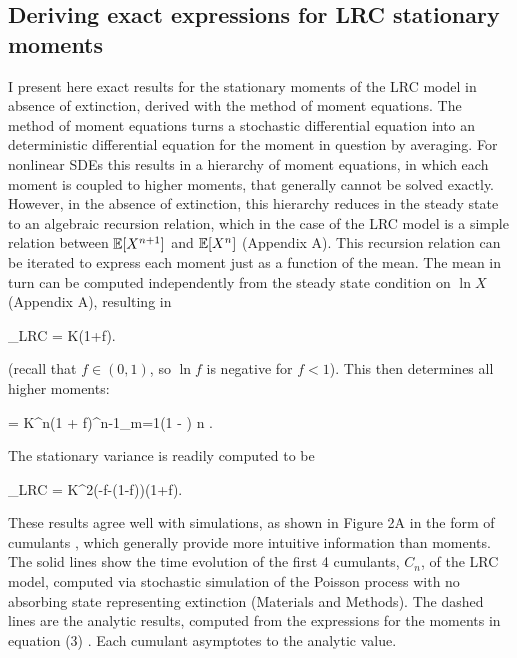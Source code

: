 \subsection{Deriving exact expressions for LRC stationary moments}

I present here exact results for the stationary moments of the LRC model in absence of extinction, derived with the method of moment equations.  The method of moment equations turns a stochastic differential equation into an deterministic differential equation for the moment in question by averaging.  For nonlinear SDEs this results in a hierarchy of moment equations, in which each moment is coupled to higher moments, that generally cannot be solved exactly.  However, in the absence of extinction, this hierarchy reduces in the steady state to an algebraic recursion relation, which in the case of the LRC model is a simple relation between $\mathbb{E}[X^{n+1}]$ and $\mathbb{E}[X^{n}]$ (Appendix A).  This recursion relation can be iterated to express each moment just as a function of the mean.  The mean in turn can be computed independently from the steady state condition on $\ln X$ (Appendix A), resulting in  

\be
\expec[ X]_{LRC} = K\left(1+\ln f\right).
\ee

\noindent (recall that $f \in (0,1)$, so $\ln f$ is negative for $ f < 1$).  This then determines all higher moments:

\be
\expec[X^n] = K^{n}\left(1 + \ln f\right)\prod^{n-1}_{m=1}\left(1 - \right) \text{,\hspace{1cm}} n .
\ee

\noindent The stationary variance is readily computed to be

\be
 \Var[X]_{LRC} = K^2\left(-\ln f-(1-f)\right)\left(1+\ln f\right).
\ee
  
These results agree well with simulations, as shown in Figure 2A in the form of cumulants \cite{broca2004cumulant}, which generally provide more intuitive information than moments.  The solid lines show the time evolution of the first 4 cumulants, $C_n$, of the LRC model, computed via stochastic simulation of the Poisson process with no absorbing state representing extinction (Materials and Methods).  The dashed lines are the analytic results, computed from the expressions for the moments in equation (3)  \cite{broca2004cumulant}.  Each cumulant asymptotes to the analytic value.


